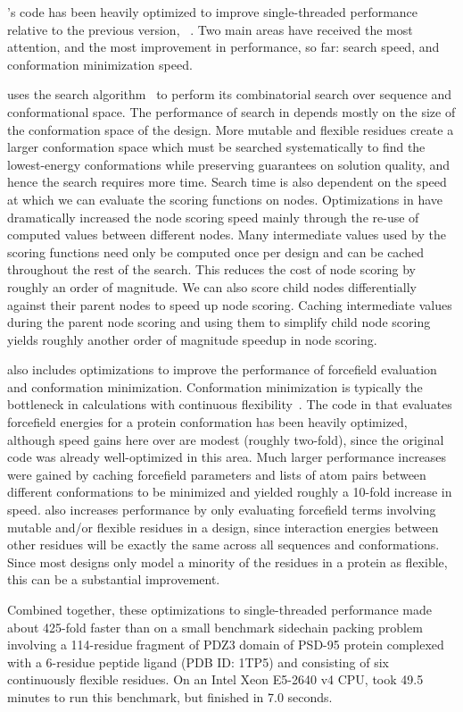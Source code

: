 's code has been heavily optimized to improve single-threaded performance relative to the previous version, ~\cite{COMETS}. Two main areas have received the most attention, and the most improvement in performance, so far: \as search speed, and conformation minimization speed.

\osprey uses the \as search algorithm~\cite{DEE/A*} to perform its combinatorial search over sequence and conformational space.  The performance of \as search in \osprey depends mostly on the size of the conformation space of the design. More mutable and flexible residues create a larger conformation space which must be searched systematically to find the lowest-energy conformations while preserving guarantees on solution quality, and hence the search requires more time. Search time is also dependent on the speed at which we can evaluate the scoring functions on \as nodes. Optimizations in  have dramatically increased the \as node scoring speed mainly through the re-use of computed values between different nodes. Many intermediate values used by the \as scoring functions need only be computed once per design and can be cached throughout the rest of the search. This reduces the cost of node scoring by roughly an order of magnitude. We can also score child nodes differentially against their parent nodes to speed up node scoring. Caching intermediate values during the parent node scoring and using them to simplify child node scoring yields roughly another order of magnitude speedup in \as node scoring. %

 also includes optimizations to improve the performance of forcefield evaluation and conformation minimization. Conformation minimization is typically the bottleneck in \osprey calculations with continuous flexibility~\cite{minDEE,iMinDEE,DEEPer,CATS}.  The code in  that evaluates forcefield energies for a protein conformation has been heavily optimized, although speed gains here over  are modest (roughly two-fold), since the original code was already well-optimized in this area. Much larger performance increases were gained by caching forcefield parameters and lists of atom pairs between different conformations to be minimized and yielded roughly a 10-fold increase in speed.  also increases performance by only evaluating forcefield terms involving mutable and/or flexible residues in a design, since interaction energies between other residues will be exactly the same across all sequences and conformations.  Since most designs only model a minority of the residues in a protein as flexible, this can be a substantial improvement. 

Combined together, these optimizations to single-threaded performance made  about 425-fold faster than  on a small benchmark sidechain packing problem involving a 114-residue fragment of PDZ3 domain of PSD-95 protein complexed with a 6-residue peptide ligand (PDB ID: 1TP5) and consisting of six continuously flexible residues.  On an Intel Xeon E5-2640 v4 CPU,  took 49.5 minutes to run this benchmark, but  finished in 7.0 seconds.  
